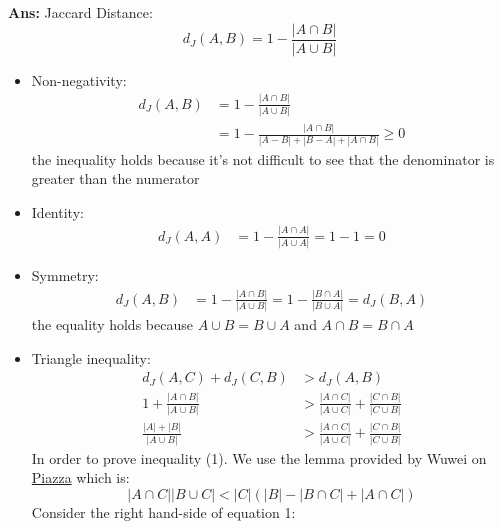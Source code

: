 \documentclass{article}
\newenvironment{proof}{\begin{mdframed}\textbf{Ans:}}{ \end{mdframed}}
\begin{document}
\begin{proof}
	Jaccard Distance: 
	\begin{equation*}
		d_J(A,B) = 1 - \frac{|A\cap B|}{|A\cup B|}
	\end{equation*}
	\begin{itemize}
		\item Non-negativity: 
		\begin{equation*}
		\begin{split}
			d_J(A,B)  &=1 - \frac{|A\cap B|}{|A\cup B|} 
					\\&= 1 - \frac{|A\cap B|}{|A-B| + |B-A|+|A\cap B|}\geq 0
		\end{split}
		\end{equation*}
		the inequality holds because it's not difficult to see that the denominator is greater than the numerator
		\item Identity: 
		\begin{equation*}
		\begin{split}
		d_J(A,A)  &= 1 - \frac{|A\cap A|}{|A\cup A|} = 1 - 1 = 0
		\end{split}
		\end{equation*}
		\item Symmetry:
		\begin{equation*}
		\begin{split}
		d_J(A,B)  &= 1 - \frac{|A\cap B|}{|A\cup B|} = 1 - \frac{|B\cap A|}{|B\cup A|} = d_J(B,A)
		\end{split}
		\end{equation*}
		the equality holds because $A\cup B = B\cup A$ and $A\cap B = B\cap A$
		\item Triangle inequality: 
		\begin{equation}
		\begin{split}
		d_J(A,C) + d_J(C,B) &> d_J(A,B) \\ 
		1 + \frac{|A\cap B|}{|A\cup B|} &> \frac{|A\cap C|}{|A\cup C|} +  \frac{|C\cap B|}{|C\cup B|}\\
		\frac{|A|+|B|}{|A\cup B|}  &> \frac{|A\cap C|}{|A\cup C|} +  \frac{|C\cap B|}{|C\cup B|}
		\end{split}
		\end{equation}
		In order to prove inequality (1). We use the lemma provided by Wuwei on \href{https://piazza.com/class/jl3rmrxp4ir6bu?cid=18}{Piazza} which is:
		\begin{equation}
			|A\cap C||B\cup C| < |C|(|B|-|B\cap C| + |A \cap C|)
		\end{equation}
		Consider the right hand-side of equation 1:

\end{itemize}
\end{proof}
\end{document}
